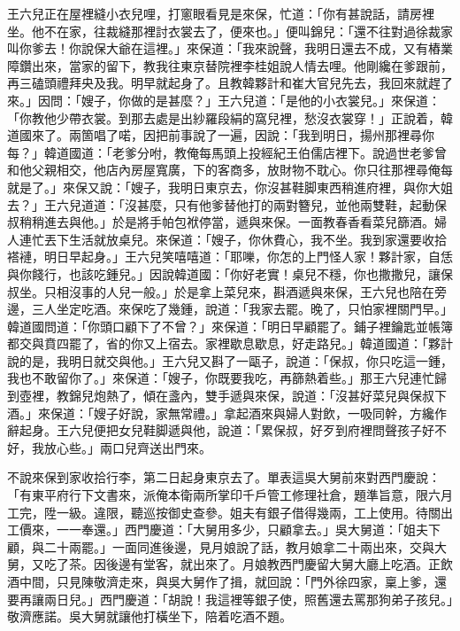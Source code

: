 王六兒正在屋裡縫小衣兒哩，打窻眼看見是來保，忙道：「你有甚說話，請房裡坐。他不在家，往裁縫那裡討衣裳去了，便來也。」便叫錦兒：「還不往對過徐裁家叫你爹去！你說保大爺在這裡。」{}來保道：「我來說聲，我明日還去不成，又有樁業障鑽出來，當家的留下，教我往東京替院裡李桂姐說人情去哩。他剛纔在爹跟前，再三磕頭禮拜央及我。{}明早就起身了。且教韓夥計和崔大官兒先去，我回來就趕了來。」因問：「嫂子，你做的是甚麼？」王六兒道：「是他的小衣裳兒。」來保道：「你教他少帶衣裳。到那去處是出紗羅段絹的窩兒裡，愁沒衣裳穿！」{}正說着，韓道國來了。兩箇唱了喏，因把前事說了一遍，因說：「我到明日，揚州那裡尋你每？」韓道國道：「老爹分咐，教俺每馬頭上投經紀王伯儒店裡下。說過世老爹曾和他父親相交，他店內房屋寬廣，下的客商多，放財物不耽心。你只往那裡尋俺每就是了。」來保又說：「嫂子，我明日東京去，你沒甚鞋脚東西稍進府裡，與你大姐去？」王六兒道道：「沒甚麼，只有他爹替他打的兩對簪兒，並他兩雙鞋，起動保叔稍稍進去與他。」於是將手帕包袱停當，遞與來保。一面教春香看菜兒篩酒。婦人連忙丟下生活就放桌兒。來保道：「嫂子，你休費心，我不坐。{}我到家還要收拾褡褳，明日早起身。」王六兒笑嘻嘻道：「耶嚛，你怎的上門怪人家！夥計家，自恁與你餞行，也該吃鍾兒。」因說韓道國：「你好老實！桌兒不穩，你也撒撒兒，讓保叔坐。只相沒事的人兒一般。」{}於是拿上菜兒來，斟酒遞與來保，王六兒也陪在旁邊，三人坐定吃酒。來保吃了幾鍾，說道：「我家去罷。晚了，只怕家裡關門早。」韓道國問道：「你頭口顧下了不曾？」來保道：「明日早顧罷了。鋪子裡鑰匙並帳簿都交與賁四罷了，省的你又上宿去。家裡歇息歇息，好走路兒。」韓道國道：「夥計說的是，我明日就交與他。」王六兒又斟了一甌子，說道：「保叔，你只吃這一鍾，我也不敢留你了。」來保道：「嫂子，你既要我吃，再篩熱着些。」{}那王六兒連忙歸到壺裡，教錦兒炮熱了，傾在盞內，雙手遞與來保，說道：「沒甚好菜兒與保叔下酒。」來保道：「嫂子好說，家無常禮。」拿起酒來與婦人對飲，一吸同幹，方纔作辭起身。王六兒便把女兒鞋脚遞與他，說道：「累保叔，好歹到府裡問聲孩子好不好，我放心些。」兩口兒齊送出門來。

不說來保到家收拾行李，第二日起身東京去了。單表這吳大舅前來對西門慶說：「有東平府行下文書來，派俺本衛兩所掌印千戶管工修理社倉，題準旨意，限六月工完，陞一級。違限，聽巡按御史查參。姐夫有銀子借得幾兩，工上使用。待關出工價來，一一奉還。」西門慶道：「大舅用多少，只顧拿去。」吳大舅道：「姐夫下顧，與二十兩罷。」一面同進後邊，見月娘說了話，教月娘拿二十兩出來，交與大舅，又吃了茶。因後邊有堂客，就出來了。月娘教西門慶留大舅大廳上吃酒。正飲酒中間，只見陳敬濟走來，與吳大舅作了揖，就回說：「門外徐四家，稟上爹，還要再讓兩日兒。」西門慶道：「胡說！我這裡等銀子使，照舊還去罵那狗弟子孩兒。」敬濟應諾。吳大舅就讓他打橫坐下，陪着吃酒不題。

